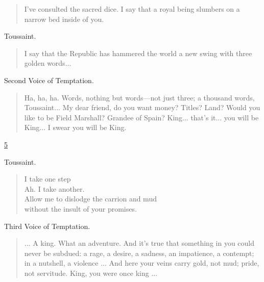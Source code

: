 \documentclass[letterpaper,article,12pt,oneside,notitlepage]{memoir}
\begin{document}
\begin{verse}
\indent I've consulted the sacred dice. I say that a royal being slumbers on a narrow bed inside of you. \\
\end{verse}

\begin{center}Toussaint.\end{center}

\begin{verse}
\indent I say that the Republic has hammered the world a new swing with three golden words... \\
\end{verse}

\begin{center}Second Voice of Temptation.\end{center}

\begin{verse}
\indent Ha, ha, ha. Words, nothing but words---not just three; a thousand words, Toussaint... My dear friend, do you want money? Titles? Land? Would you like to be Field Marshall? Grandee of Spain? King... that's it... you will be King... I swear you will be King. \\
\end{verse}

\clearpage

\href{http://cesaire.elotroalex.com/chiens/chiens/p005.html}{5}

\begin{center}Toussaint.\end{center}

\begin{verse}
I take one step \\
Ah. I take another. \\
Allow me to dislodge the carrion and mud \\
without the insult of your promises. \\
\end{verse}

\begin{center}Third Voice of Temptation.\end{center}

\begin{verse}
\indent ... A king. What an adventure. And it's true that something in you could never be subdued: a rage, a desire, a sadness, an impatience, a contempt; in a nutshell, a violence ... And here your veins carry gold, not mud; pride, not servitude. King, you were once king ... \\
\end{verse}
\end{document}
